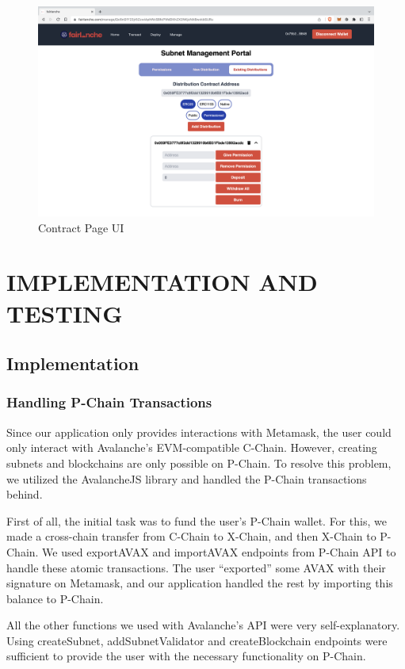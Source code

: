 \documentclass[a4paper,12pt]{report}
\begin{document}
\begin{figure}[H]
	\centering
	\includegraphics[width=1\textwidth]{ss11.png}
	\caption{Contract Page UI}
\end{figure}

\chapter{IMPLEMENTATION AND TESTING}
\section{Implementation}
\subsection{Handling P-Chain Transactions}
Since our application only provides interactions with Metamask, the user could only interact with Avalanche’s EVM-compatible C-Chain. However, creating subnets and blockchains are only possible on P-Chain. To resolve this problem, we utilized the AvalancheJS library and handled the P-Chain transactions behind. 

First of all, the initial task was to fund the user’s P-Chain wallet. For this, we made a cross-chain transfer from C-Chain to X-Chain, and then X-Chain to P-Chain. We used exportAVAX and importAVAX endpoints from P-Chain API to handle these atomic transactions. The user “exported” some AVAX with their signature on Metamask, and our application handled the rest by importing this balance to P-Chain.

All the other functions we used with Avalanche’s API were very self-explanatory. Using createSubnet, addSubnetValidator and createBlockchain endpoints were sufficient to provide the user with the necessary functionality on P-Chain.
\end{document}
